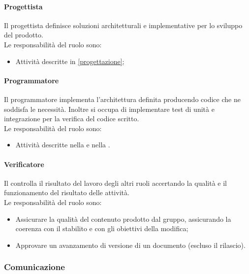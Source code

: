 \paragraph{Progettista}
Il progettista definisce soluzioni architetturali e implementative per lo sviluppo del prodotto.\\
Le responsabilità del ruolo sono:
\begin{itemize}
  \item Attività descritte in \ref{progettazione};
\end{itemize}

\paragraph{Programmatore}
Il programmatore{} implementa l'architettura definita producendo codice che ne soddisfa le necessità. Inoltre si occupa di implementare test di unità e integrazione per la verifica del codice scritto.\\
Le responsabilità del ruolo sono:
\begin{itemize}
  \item Attività descritte nella  e nella .
\end{itemize}

\paragraph{Verificatore}
Il \Verificatore{} controlla il risultato del lavoro degli altri ruoli accertando la qualità e il funzionamento del risultato delle attività.\\
Le responsabilità del ruolo sono:
\begin{itemize}
  \item Assicurare la qualità del contenuto prodotto dal gruppo, assicurando la coerenza con il \WoW{} stabilito e con gli obiettivi della modifica;
  \item Approvare un avanzamento di versione di un documento (escluso il rilascio).
\end{itemize}

\subsubsection{Comunicazione}
